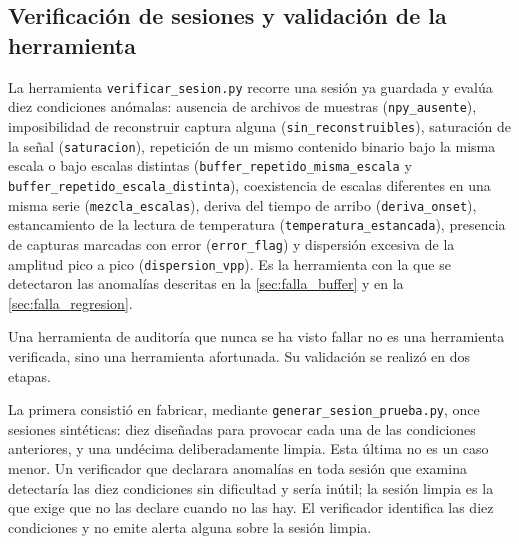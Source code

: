 
\subsection{Verificación de sesiones y validación de la herramienta}
\label{sec:val_verificador}

La herramienta \texttt{verificar\_sesion.py} recorre una sesión ya
guardada y evalúa diez condiciones anómalas: ausencia de archivos de
muestras (\texttt{npy\_ausente}), imposibilidad de reconstruir captura
alguna (\texttt{sin\_reconstruibles}), saturación de la señal
(\texttt{saturacion}), repetición de un mismo contenido binario bajo
la misma escala o bajo escalas distintas
(\texttt{buffer\_repetido\_misma\_escala} y
\texttt{buffer\_repetido\_escala\_distinta}), coexistencia de escalas
diferentes en una misma serie (\texttt{mezcla\_escalas}), deriva del
tiempo de arribo (\texttt{deriva\_onset}), estancamiento de la lectura
de temperatura (\texttt{temperatura\_estancada}), presencia de
capturas marcadas con error (\texttt{error\_flag}) y dispersión
excesiva de la amplitud pico a pico (\texttt{dispersion\_vpp}). Es la
herramienta con la que se detectaron las anomalías descritas en la
\cref{sec:falla_buffer} y en la \cref{sec:falla_regresion}.

Una herramienta de auditoría que nunca se ha visto fallar no es una
herramienta verificada, sino una herramienta afortunada. Su validación
se realizó en dos etapas.

La primera consistió en fabricar, mediante
\texttt{generar\_sesion\_prueba.py}, once sesiones sintéticas: diez
diseñadas para provocar cada una de las condiciones anteriores, y una
undécima deliberadamente limpia. Esta última no es un caso menor. Un
verificador que declarara anomalías en toda sesión que examina
detectaría las diez condiciones sin dificultad y sería inútil; la
sesión limpia es la que exige que no las declare cuando no las hay. El
verificador identifica las diez condiciones y no emite alerta alguna
sobre la sesión limpia.

